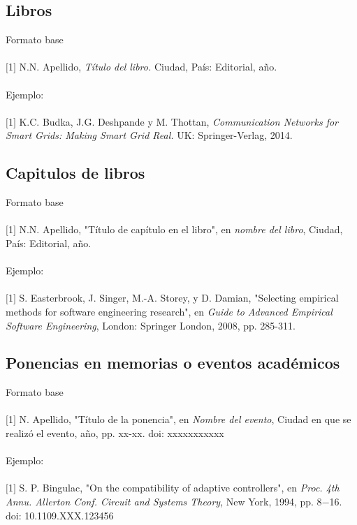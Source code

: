 \documentclass[10pt,letterpaper,twoside,twocolumn]{article}   %
\begin{document}
\subsection*{Libros}
Formato base\\
\\
$[$1$]$ N.N. Apellido, \textit{Título del libro.} Ciudad, País: Editorial, año.\\
\\
Ejemplo:\\
\\
$[$1$]$ K.C. Budka, J.G. Deshpande y M. Thottan, \textit{Communication Networks for Smart Grids: Making Smart Grid Real.} UK: Springer-Verlag, 2014.
\subsection*{Capitulos de libros}
Formato base\\
\\
$[$1$]$ N.N. Apellido, "Título de capítulo en el libro", en \textit{nombre del libro}, Ciudad, País: Editorial, año.\\
\\
Ejemplo:\\
\\
$[$1$]$ S. Easterbrook, J. Singer, M.-A. Storey, y D. Damian, "Selecting empirical methods for software engineering research", en \textit{Guide to Advanced Empirical Software Engineering}, London: Springer London, 2008, pp. 285-311.
\subsection*{Ponencias en memorias o eventos académicos}
Formato base\\
\\
$[$1$]$ N. Apellido, "Título de la ponencia", en \textit{Nombre del evento}, Ciudad en que se realizó el evento, año, pp. xx-xx. doi: xxxxxxxxxxx\\
\\
Ejemplo:\\
\\
$[$1$]$ S. P. Bingulac, "On the compatibility of adaptive controllers", en \textit{Proc. 4th Annu. Allerton Conf. Circuit and Systems Theory}, New York, 1994, pp. 8$-$16. doi: 10.1109.XXX.123456
\end{document}
